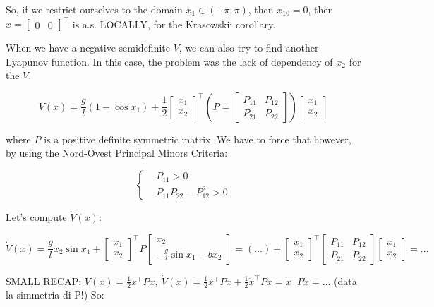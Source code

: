 So, if we restrict ourselves to the domain $x_1 \in (-\pi,\pi)$, then $x_{10} = 0$, then $x=\begin{bmatrix}0 & 0\end{bmatrix}^\top$ is a.s. LOCALLY, for the Krasowskii corollary.

When we have a negative semidefinite $\dot{V}$, we can also try to find another Lyapunov function. In this case, the problem was the lack of dependency of $x_2$ for the $V$.

\[
	V(x) = \frac{g}{l}(1-\cos{x_1}) + \frac{1}{2}\begin{bmatrix}x_1\\x_2\end{bmatrix}^\top (P=\begin{bmatrix}P_{11} & P_{12} \\ P_{21} & P_{22}\end{bmatrix})\begin{bmatrix}x_1\\x_2\end{bmatrix}
\]

where $P$ is a positive definite symmetric matrix. We have to force that however, by using the Nord-Ovest Principal Minors Criteria:

\[
	\left\{
	\begin{aligned}
	&P_{11} > 0 \\
	&P_{11}P_{22} - P_{12}^2 > 0
	\end{aligned} 
	\right.
\]

Let's compute $\dot{V}(x)$:

\[
	\dot{V}(x) = \frac{g}{l}x_2\sin{x_1} + \begin{bmatrix}x_1\\x_2\end{bmatrix}^\top P \begin{bmatrix}x_2 \\ -\frac{g}{l}\sin{x_1}-bx_2\end{bmatrix} = (\dots) + \begin{bmatrix}x_1\\x_2\end{bmatrix}^\top \begin{bmatrix}P_{11} & P_{12} \\ P_{21} & P_{22}\end{bmatrix} \begin{bmatrix}x_1\\x_2\end{bmatrix} = \dots
\]

SMALL RECAP: $V(x) = \frac{1}{2}x^\top Px,\ \dot{V}(x) = \frac{1}{2}x^\top P\dot{x} + \frac{1}{2}\dot{x}^\top Px = x^\top P\dot{x} = \dots$ (data la simmetria di P!) So:


